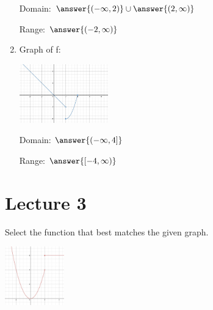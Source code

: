 \documentclass{ximera}
\begin{document}
\begin{problem}
\begin{enumerate}
 Domain:  $\answer{(-\infty,2)}\cup\answer{(2,\infty)}$
 
 Range: $\answer{(-2,\infty)}$
 \item Graph of f:
     \begin{image}
   \includegraphics[height=1in]{160H2pic5.jpg}
 \end{image}
 
 Domain: $\answer{(-\infty,4]}$
 
 Range: $\answer{[-4,\infty)}$
\end{enumerate}
\end{problem}
\section{Lecture 3}
\begin{problem}\label{prob:160hom2prob4}
Select the function that best matches the given graph.
\begin{image}
   \includegraphics[height=1in]{160H2pic6.jpg}
 \end{image}
\begin{multipleChoice}  
\end{multipleChoice}  
\end{problem}
\end{document}
